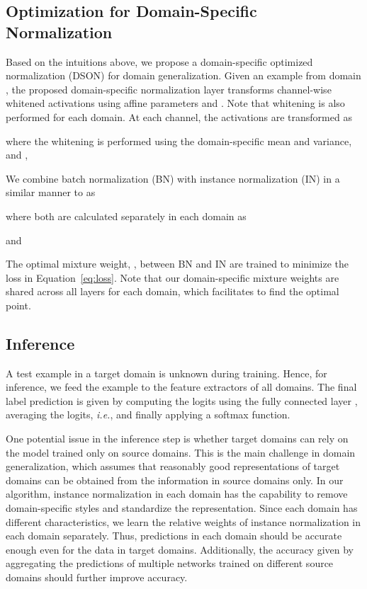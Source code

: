 \documentclass[runningheads]{llncs}
\newcommand\ie{\textit{i.e.}}
\begin{document}
\subsection{Optimization for Domain-Specific Normalization}
\label{sub:dson}
{\color{black}
Based on the intuitions above, we propose a domain-specific optimized normalization (DSON) for domain generalization.}
Given an example from domain , the proposed domain-specific normalization layer transforms channel-wise whitened activations using affine parameters  and .
{\color{black}Note that whitening is also performed for each domain.}
At each channel, the activations  are transformed as

where the whitening is performed using the domain-specific mean and variance,  and ,


We combine batch normalization (BN) with instance normalization (IN) in a similar manner to \cite{sn} as

where both are calculated separately in each domain as

and

The optimal mixture weight, , between BN and IN are trained to minimize the loss in Equation~\ref{eq:loss}.
Note that our domain-specific mixture weights are shared across all layers for each domain, which facilitates to find the optimal point.

\subsection{Inference}

A test example  in a target domain is unknown during training.
Hence, for inference, we feed the example to the feature extractors of all domains.
The final label prediction is given by computing the logits using the fully connected layer , averaging the logits, \ie , and finally applying a softmax function.

One potential issue in the inference step is whether target domains can rely on the model trained only on source domains.
This is the main challenge in domain generalization, which assumes that reasonably good representations of target domains can be obtained from the information in source domains only. 
{\color{black}
In our algorithm, instance normalization in each domain has the capability to remove domain-specific styles and standardize the representation.}
Since each domain has different characteristics, we learn the relative weights of instance normalization in each domain separately.
Thus, predictions in each domain should be accurate enough even for the data in target domains. Additionally, the accuracy given by aggregating the predictions of multiple networks trained on different source domains should further improve accuracy.
 
\end{document}

